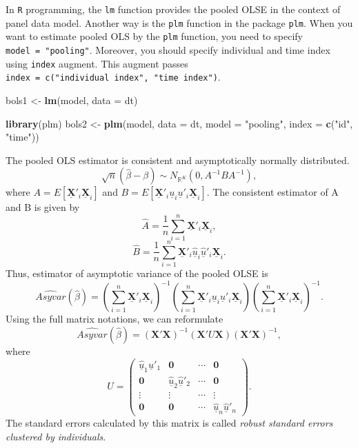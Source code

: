 \documentclass[
  12pt,
]{article}
\newenvironment{Shaded}{\begin{snugshade}}{\end{snugshade}}
\newcommand{\DataTypeTok}[1]{\textcolor[rgb]{0.13,0.29,0.53}{#1}}
\newcommand{\KeywordTok}[1]{\textcolor[rgb]{0.13,0.29,0.53}{\textbf{#1}}}
\newcommand{\NormalTok}[1]{#1}
\newcommand{\StringTok}[1]{\textcolor[rgb]{0.31,0.60,0.02}{#1}}
\begin{document}
In \texttt{R} programming, the \texttt{lm} function provides the pooled OLSE in the context of panel data model.
Another way is the \texttt{plm} function in the package \texttt{plm}.
When you want to estimate pooled OLS by the \texttt{plm} function, you need to specify \texttt{model\ =\ "pooling"}.
Moreover, you should specify individual and time index using \texttt{index} augment.
This augment passes \texttt{index\ =\ c("individual\ index",\ "time\ index")}.

\begin{Shaded}
\begin{Highlighting}[]
\NormalTok{bols1 \textless{}{-}}\StringTok{ }\KeywordTok{lm}\NormalTok{(model, }\DataTypeTok{data =}\NormalTok{ dt)}

\KeywordTok{library}\NormalTok{(plm)}
\NormalTok{bols2 \textless{}{-}}\StringTok{ }\KeywordTok{plm}\NormalTok{(model, }\DataTypeTok{data =}\NormalTok{ dt, }\DataTypeTok{model =} \StringTok{"pooling"}\NormalTok{, }\DataTypeTok{index =} \KeywordTok{c}\NormalTok{(}\StringTok{"id"}\NormalTok{, }\StringTok{"time"}\NormalTok{))}
\end{Highlighting}
\end{Shaded}

The pooled OLS estimator is consistent and asymptotically normally distributed.
\[
  \sqrt{n}(\hat{\beta} - \beta) \sim N_{\mathbb{R}^K}(0, A^{-1} B A^{-1}),
\]
where \(A = E[\underline{\mathbf{X}}'_i\underline{\mathbf{X}}_i]\)
and \(B = E[\underline{\mathbf{X}}'_i \underline{u}_i \underline{u}'_i \underline{\mathbf{X}}_i]\).
The consistent estimator of A and B is given by
\[
  \hat{A} = \frac{1}{n} \sum_{i=1}^n \underline{\mathbf{X}}'_i\underline{\mathbf{X}}_i,
\]
\[
  \hat{B} = \frac{1}{n} \sum_{i=1}^n \underline{\mathbf{X}}'_i \underline{\hat{u}}_i \underline{\hat{u}}'_i \underline{\mathbf{X}}_i.
\]
Thus, estimator of asymptotic variance of the pooled OLSE is
\[
  \widehat{Asyvar}(\hat{\beta}) =
  \left( \sum_{i=1}^n \underline{\mathbf{X}}'_i\underline{\mathbf{X}}_i \right)^{-1}
  \left( \sum_{i=1}^n \underline{\mathbf{X}}'_i \underline{u}_i \underline{u}'_i \underline{\mathbf{X}}_i \right)
  \left( \sum_{i=1}^n \underline{\mathbf{X}}'_i\underline{\mathbf{X}}_i \right)^{-1}.
\]
Using the full matrix notations, we can reformulate
\[
  \widehat{Asyvar}(\hat{\beta}) =
  (\mathbf{X}' \mathbf{X})^{-1}
  (\mathbf{X}' U \mathbf{X})
  (\mathbf{X}' \mathbf{X})^{-1},
\]
where
\[
  U = 
  \begin{pmatrix}
    \underline{\hat{u}}_1 \underline{\hat{u}}'_1 & \mathbf{0} & \cdots & \mathbf{0} \\
    \mathbf{0} & \underline{\hat{u}}_2 \underline{\hat{u}}'_2 & \cdots & \mathbf{0} \\
    \vdots & \vdots & \cdots & \vdots \\
    \mathbf{0} & \mathbf{0} & \cdots & \underline{\hat{u}}_n \underline{\hat{u}}'_n
  \end{pmatrix}.
\]
The standard errors calculated by this matrix is called \emph{robust standard errors clustered by individuals}.
\end{document}
